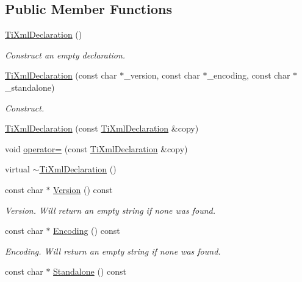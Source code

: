 \subsection*{Public Member Functions}
\begin{DoxyCompactItemize}
\item 
\hyperlink{classTiXmlDeclaration_aa0484d059bea0ea1acb47c9094382d79}{TiXmlDeclaration} ()
\begin{DoxyCompactList}\small\item\em Construct an empty declaration. \item\end{DoxyCompactList}\item 
\hyperlink{classTiXmlDeclaration_a3b618d1c30c25e4b7a71f31a595ee298}{TiXmlDeclaration} (const char $\ast$\_\-version, const char $\ast$\_\-encoding, const char $\ast$\_\-standalone)
\begin{DoxyCompactList}\small\item\em Construct. \item\end{DoxyCompactList}\item 
\hyperlink{classTiXmlDeclaration_a58ac9042c342f7845c8491da0bb091e8}{TiXmlDeclaration} (const \hyperlink{classTiXmlDeclaration}{TiXmlDeclaration} \&copy)
\item 
void \hyperlink{classTiXmlDeclaration_a0fedc57539af9049be8db2d7d9d9ba33}{operator=} (const \hyperlink{classTiXmlDeclaration}{TiXmlDeclaration} \&copy)
\item 
virtual \hyperlink{classTiXmlDeclaration_ad5f37a673f4c507fd7e550470f9cec25}{$\sim$TiXmlDeclaration} ()
\item 
const char $\ast$ \hyperlink{classTiXmlDeclaration_a02ee557b1a4545c3219ed377c103ec76}{Version} () const 
\begin{DoxyCompactList}\small\item\em Version. Will return an empty string if none was found. \item\end{DoxyCompactList}\item 
const char $\ast$ \hyperlink{classTiXmlDeclaration_a5d974231f9e9a2f0542f15f3a46cdb76}{Encoding} () const 
\begin{DoxyCompactList}\small\item\em Encoding. Will return an empty string if none was found. \item\end{DoxyCompactList}\item 
const char $\ast$ \hyperlink{classTiXmlDeclaration_a9ff06afc033d7ef730ec7c6825b97ad9}{Standalone} () const 

\end{DoxyCompactItemize}
